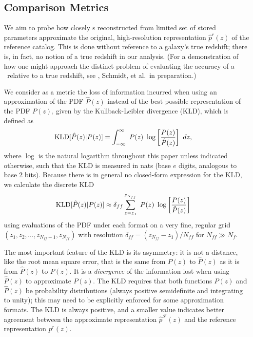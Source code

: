 \subsection{Comparison Metrics}

We aim to probe how closely \pz s reconstructed from limited set of stored 
parameters approximate the original, high-resolution representation 
$\hat{p}^{r}(z)$ of the reference catalog.
This is done without reference to a galaxy's true redshift; there is, in fact, 
no notion of a true redshift in our analysis.
(For a demonstration of how one might approach the distinct problem of 
evaluating the accuracy of a \pz\ relative to a true redshift, see 
\citet{polsterer_uncertain_2016}, Schmidt, et al.\ in preparation.)


We consider as a metric the loss of information incurred when using an 
approximation of the PDF $\hat{P}(z)$ instead of the best possible 
representation of the  PDF $P(z)$, given by the Kullback-Leibler divergence 
(KLD), which is defined as
\begin{align}
\eqlabel{eq:kld}
\mathrm{KLD}[\hat{P}(z) | P(z)] &= \int_{-\infty}^{\infty}\ P(z)\ 
\log\left[\frac{P(z)}{\hat{P}(z)}\right]\ dz,
\end{align}
where $\log$ is the natural logarithm throughout this paper unless indicated 
otherwise, such that the KLD is measured in nats (base $e$ digits, analogous to 
base 2 bits).
Because there is in general no closed-form expression for the KLD, we calculate 
the discrete KLD
\begin{align}
\eqlabel{eq:kld_approx}
\mathrm{KLD}[\hat{P}(z) | P(z)] &\approx 
\delta_{ff}\sum_{z=z_{1}}^{z_{N_{ff}}}\ P(z)\ 
\log\left[\frac{P(z)}{\hat{P}(z)}\right]
\end{align}
using evaluations of the PDF under each format on a very fine, regular grid 
$(z_{1}, z_{2}, \dots, z_{N_{ff}-1}, z_{N_{ff}})$ with resolution $\delta_{ff} 
= (z_{N_{ff}} -z_{1}) / N_{ff}$ for $N_{ff} \gg N_{f}$.

The most important feature of the KLD is its asymmetry: it is not a distance, 
like the root mean square error, that is the same from $P(z)$ to $\hat{P}(z)$ 
as it is from $\hat{P}(z)$ to $P(z)$.
It is a \textit{divergence} of the information lost when using $\hat{P}(z)$ to 
approximate $P(z)$.
The KLD requires that both functions $P(z)$ and $\hat{P}(z)$ be probability 
distributions (always positive semidefinite and integrating to unity); this may 
need to be explicitly enforced for some approximation formats.
The KLD is always positive, and a smaller value indicates better agreement 
between the approximate representation $\hat{p}^{\mathcal{F}}(z)$ and the 
reference representation $p^{r}(z)$.


